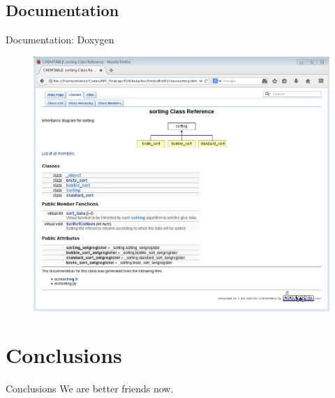 \documentclass{beamer}
\begin{document}

\subsection{Documentation}
\begin{frame}{Documentation: Doxygen}
\begin{figure}
\includegraphics[scale=0.35]{doxygen.png}
\end{figure}

\end{frame}


\section{Conclusions}

\begin{frame}{Conclusions}
We are better friends now.


\end{frame}
\end{document}
